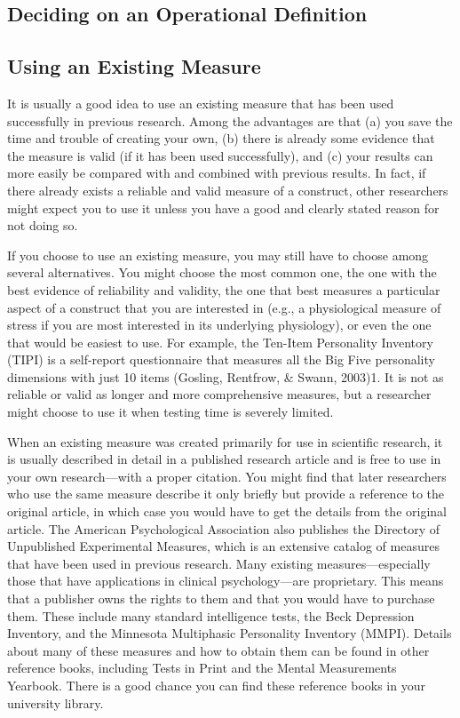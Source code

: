 \subsection{Deciding on an Operational Definition}

\subsection{Using an Existing Measure}

It is usually a good idea to use an existing measure that has been used successfully in previous research. Among the advantages are that (a) you save the time and trouble of creating your own, (b) there is already some evidence that the measure is valid (if it has been used successfully), and (c) your results can more easily be compared with and combined with previous results. In fact, if there already exists a reliable and valid measure of a construct, other researchers might expect you to use it unless you have a good and clearly stated reason for not doing so.

If you choose to use an existing measure, you may still have to choose among several alternatives. You might choose the most common one, the one with the best evidence of reliability and validity, the one that best measures a particular aspect of a construct that you are interested in (e.g., a physiological measure of stress if you are most interested in its underlying physiology), or even the one that would be easiest to use. For example, the Ten-Item Personality Inventory (TIPI) is a self-report questionnaire that measures all the Big Five personality dimensions with just 10 items (Gosling, Rentfrow, \& Swann, 2003)1. It is not as reliable or valid as longer and more comprehensive measures, but a researcher might choose to use it when testing time is severely limited.

When an existing measure was created primarily for use in scientific research, it is usually described in detail in a published research article and is free to use in your own research—with a proper citation. You might find that later researchers who use the same measure describe it only briefly but provide a reference to the original article, in which case you would have to get the details from the original article. The American Psychological Association also publishes the Directory of Unpublished Experimental Measures, which is an extensive catalog of measures that have been used in previous research. Many existing measures—especially those that have applications in clinical psychology—are proprietary. This means that a publisher owns the rights to them and that you would have to purchase them. These include many standard intelligence tests, the Beck Depression Inventory, and the Minnesota Multiphasic Personality Inventory (MMPI). Details about many of these measures and how to obtain them can be found in other reference books, including Tests in Print and the Mental Measurements Yearbook. There is a good chance you can find these reference books in your university library.

